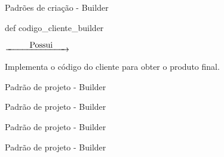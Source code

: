 \begin{frame}[t]{Padrões de criação - Builder}
\begin{minipage}{6cm}
\begin{block}{}
		\end{block}
	\end{minipage}
	\vfill
	\begin{minipage}{4cm}
		\begin{block}{}
			def codigo\_cliente\_builder
		\end{block}
	\end{minipage} 
	$\underrightarrow{\makebox[2cm][r]{Possui}\hspace{2em}}$
	\begin{minipage}{6cm}
		\begin{block}{}
			Implementa o código do cliente para obter o produto final.
		\end{block}
	\end{minipage}
\end{frame}





\begin{frame}[t]{Padrão de projeto - Builder}

	

	

\end{frame}


\begin{frame}[t]{Padrão de projeto - Builder}

	

\end{frame}


\begin{frame}[t]{Padrão de projeto - Builder}
	
	
	
\end{frame}


\begin{frame}[t]{Padrão de projeto - Builder}
	
	
	
\end{frame}


